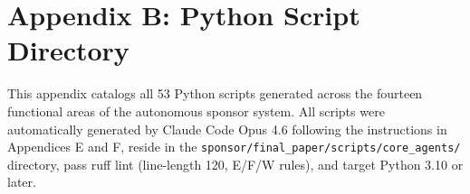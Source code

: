 \section*{Appendix B: Python Script Directory}

This appendix catalogs all 53 Python scripts generated across the fourteen functional areas
of the autonomous sponsor system. All scripts were automatically generated by Claude Code
Opus 4.6 following the instructions in Appendices E and F, reside in the
\texttt{sponsor/final\_paper/scripts/core\_agents/} directory, pass ruff lint
(line-length 120, E/F/W rules), and target Python 3.10 or later.

